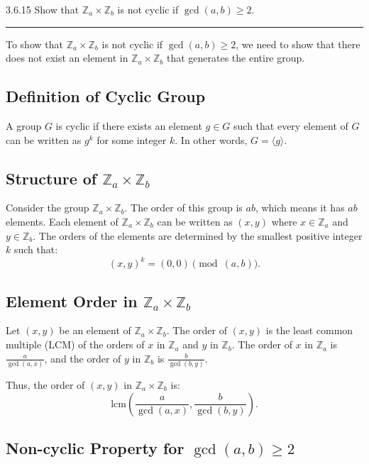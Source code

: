 \documentclass[12pt]{amsart}
\theoremstyle{definition}
\numberwithin{equation}{section}
\newcommand{\Z}{\mathbb{Z}}
\begin{document}
\begin{exercise}{3.6.15} Show that \(\Z_a \times \Z_b\) is not cyclic if \(\gcd(a,b) \geq 2\). 

    \noindent\rule{\linewidth}{1pt}
    
    To show that \(\Z_a \times \Z_b\) is not cyclic if \(\gcd(a,b) \geq 2\), we need to show that there does not exist an element in \(\Z_a \times \Z_b\) that generates the entire group. 

    \subsection*{Definition of Cyclic Group}

    A group \(G\) is cyclic if there exists an element \(g \in G\) such that every element of \(G\) can be written as \(g^k\) for some integer \(k\). In other words, \(G = \langle g \rangle\).

    \subsection*{Structure of \(\Z_a \times \Z_b\)}

    Consider the group \(\Z_a \times \Z_b\). The order of this group is \(ab\), which means it has \(ab\) elements. Each element of \(\Z_a \times \Z_b\) can be written as \((x, y)\) where \(x \in \Z_a\) and \(y \in \Z_b\). The orders of the elements are determined by the smallest positive integer \(k\) such that:
    \[
    (x, y)^k = (0, 0) \pmod{(a, b)}.
    \]

    \subsection*{Element Order in \(\Z_a \times \Z_b\)}

    Let \((x, y)\) be an element of \(\Z_a \times \Z_b\). The order of \((x, y)\) is the least common multiple (LCM) of the orders of \(x\) in \(\Z_a\) and \(y\) in \(\Z_b\). The order of \(x\) in \(\Z_a\) is \(\frac{a}{\gcd(a,x)}\), and the order of \(y\) in \(\Z_b\) is \(\frac{b}{\gcd(b,y)}\).

    Thus, the order of \((x, y)\) in \(\Z_a \times \Z_b\) is:
    \[
    \text{lcm}\left(\frac{a}{\gcd(a,x)}, \frac{b}{\gcd(b,y)}\right).
    \]

    \subsection*{Non-cyclic Property for \(\gcd(a, b) \geq 2\)}


\end{exercise}
\end{document}
